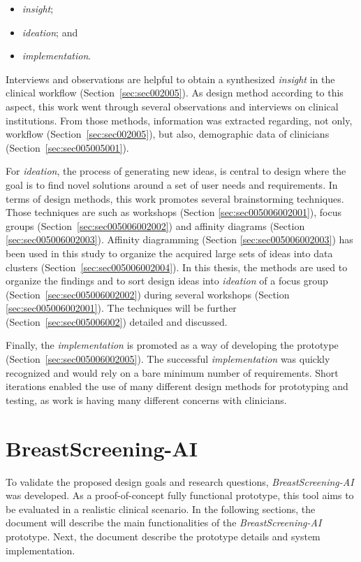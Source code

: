 \begin{itemize}
\item {\it insight};
\item {\it ideation}; and
\item {\it implementation}.
\end{itemize}

Interviews and observations are helpful to obtain a synthesized {\it insight} in the clinical workflow (Section~\ref{sec:sec002005}).
As design method according to this aspect, this work went through several observations and interviews on clinical institutions.
From those methods, information was extracted regarding, not only, workflow (Section~\ref{sec:sec002005}), but also, demographic data of clinicians (Section~\ref{sec:sec005005001}).

For {\it ideation}, the process of generating new ideas, is central to design where the goal is to find novel solutions around a set of user needs and requirements.
In terms of design methods, this work promotes several brainstorming techniques.
Those techniques are such as workshops (Section \ref{sec:sec005006002001}), focus groups (Section~\ref{sec:sec005006002002}) and affinity diagrams (Section \ref{sec:sec005006002003}).
Affinity diagramming (Section \ref{sec:sec005006002003}) has been used in this study to organize the acquired large sets of ideas into data clusters (Section~\ref{sec:sec005006002004}).
In this thesis, the methods are used to organize the findings and to sort design ideas into {\it ideation} of a focus group (Section~\ref{sec:sec005006002002}) during several workshops (Section \ref{sec:sec005006002001}).
The techniques will be further (Section~\ref{sec:sec005006002}) detailed and discussed.

Finally, the {\it implementation} is promoted as a way of developing the prototype (Section~\ref{sec:sec005006002005}).
The successful {\it implementation} was quickly recognized and would rely on a bare minimum number of requirements.
Short iterations enabled the use of many different design methods for prototyping and testing, as work is having many different concerns with clinicians.

\section{BreastScreening-AI}
\label{sec:sec005004}

To validate the proposed design goals and research questions, {\it BreastScreening-AI} was developed.
As a proof-of-concept fully functional prototype, this tool aims to be evaluated in a realistic clinical scenario.
In the following sections, the document will describe the main functionalities of the {\it BreastScreening-AI} prototype.
Next, the document describe the prototype details and system implementation.


